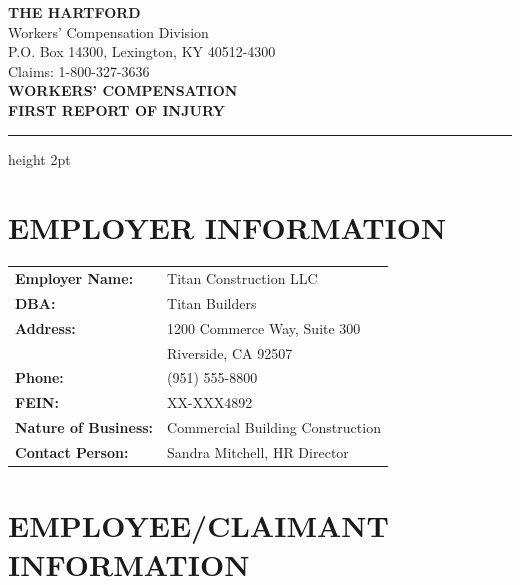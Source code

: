 \documentclass[11pt]{article}
\begin{document}
\begin{center}
{\Large\bfseries\color{hartfordblue} THE HARTFORD}\\[0.3em]
{\small Workers' Compensation Division}\\
{\small P.O. Box 14300, Lexington, KY 40512-4300}\\
{\small Claims: 1-800-327-3636}\\[1em]
{\LARGE\bfseries WORKERS' COMPENSATION}\\
{\Large\bfseries FIRST REPORT OF INJURY}
\end{center}

\vspace{0.5em}
\hrule height 2pt
\vspace{1em}

\begin{center}
\end{center}

\vspace{1em}

\section*{EMPLOYER INFORMATION}

\begin{tabular}{@{}p{4cm}p{10cm}@{}}
\textbf{Employer Name:} & Titan Construction LLC \\
\textbf{DBA:} & Titan Builders \\
\textbf{Address:} & 1200 Commerce Way, Suite 300 \\
& Riverside, CA 92507 \\
\textbf{Phone:} & (951) 555-8800 \\
\textbf{FEIN:} & XX-XXX4892 \\
\textbf{Nature of Business:} & Commercial Building Construction \\
\textbf{Contact Person:} & Sandra Mitchell, HR Director \\
\end{tabular}

\section*{EMPLOYEE/CLAIMANT INFORMATION}
\end{document}
